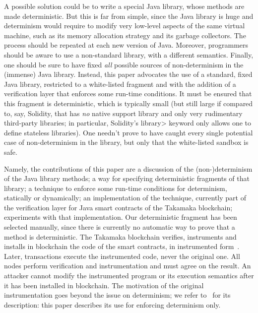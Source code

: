 A possible solution could be to write a special Java library, whose
methods are made deterministic. But this is far from simple, since the Java library is huge
and determinism would require to modify very low-level aspects of the same virtual machine, such as
its memory allocation strategy and its garbage collectors.
The process should be repeated at each new version of Java.
Moreover, programmers should be aware to use a non-standard library, with a different semantics.
Finally, one should be sure to have fixed \emph{all} possible sources of non-determinism in the
(immense) Java library.
Instead, this paper advocates the use of a standard, fixed Java library, restricted to a white-listed
fragment and with the addition of a verification layer that enforces some run-time conditions.
It must be ensured that this fragment is deterministic, which is typically small (but still
large if compared to, say, Solidity, that has \emph{no} native support library and only very
rudimentary third-party libraries; in particular, Solidity's \<library> keyword
only allows one to define stateless libraries). One needn't prove
to have caught every single potential case of non-determinism in the library, but only that
the white-listed sandbox is safe.

Namely, the contributions of this paper are a discussion of the (non-)determi\-nism
of the Java library methods; a way for specifying deterministic fragments
of that library; a technique to enforce
some run-time conditions for determinism, statically or dynamically;
an implementation of the technique, currently part of the verification
layer for Java smart contracts of the Takamaka blockchain;
experiments with that implementation.
Our deterministic fragment has been selected manually, since there is
currently no automatic way to prove that a method is deterministic.
The Takamaka blockchain verifies, instruments and installs in blockchain the code of the smart
contracts, in instrumented form~\cite{Spoto19}. Later, transactions execute the
instrumented code, never the original one. All nodes perform verification and instrumentation
and must agree on the result. An attacker cannot modify the instrumented program
or its execution semantics after it has been installed in blockchain.
The motivation of the original instrumentation goes beyond the issue on determinism;
we refer to~\cite{Spoto19} for its description: this paper describes its use for enforcing
determinism only.

